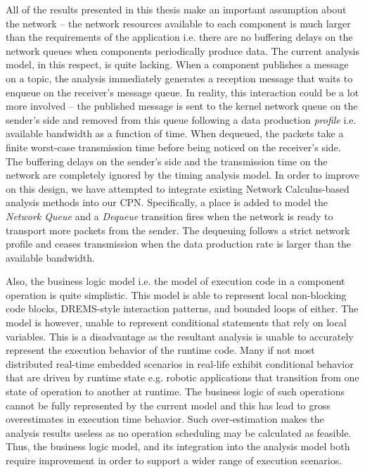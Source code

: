 All of the results presented in this thesis make an important assumption about the network -- the network resources available to each component is much larger than the requirements of the application i.e. there are no buffering delays on the network queues when components periodically produce data. The current analysis model, in this respect, is quite lacking. When a component publishes a message on a topic, the analysis immediately generates a reception message that waits to enqueue on the receiver's message queue. In reality, this interaction could be a lot more involved -- the published message is sent to the kernel network queue on the sender's side and removed from this queue following a data production \emph{profile} i.e. available bandwidth as a function of time. When dequeued, the packets take a finite worst-case transmission time before being noticed on the receiver's side. The buffering delays on the sender's side and the transmission time on the network are completely ignored by the timing analysis model. In order to improve on this design, we have attempted to integrate existing Network Calculus-based analysis methods \cite{ISIS_F6_CYPHY:14} into our CPN. Specifically, a place is added to model the \emph{Network Queue} and a \emph{Dequeue} transition fires when the network is ready to transport more packets from the sender. The dequeuing follows a strict network profile and ceases transmission when the data production rate is larger than the available bandwidth. 

Also, the business logic model i.e. the model of execution code in a component operation is quite simplistic. This model is able to represent local non-blocking code blocks, DREMS-style interaction patterns, and bounded loops of either. The model is however, unable to represent conditional statements that rely on local variables. This is a disadvantage as the resultant analysis is unable to accurately represent the execution behavior of the runtime code. Many if not most distributed real-time embedded scenarios in real-life exhibit conditional behavior that are driven by runtime state e.g. robotic applications that transition from one state of operation to another at runtime. The business logic of such operations cannot be fully represented by the current model and this has lead to gross overestimates in execution time behavior. Such over-estimation makes the analysis results useless as no operation scheduling may be calculated as feasible. Thus, the business logic model, and its integration into the analysis model both require improvement in order to support a wider range of execution scenarios. 

